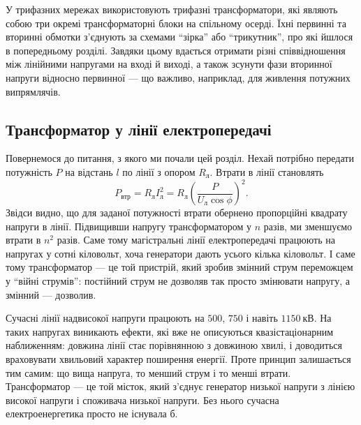 У трифазних мережах використовують трифазні трансформатори, які
являють собою три окремі трансформаторні блоки на спільному
осерді. Їхні первинні та вторинні обмотки з'єднують за схемами
\enquote{зірка} або \enquote{трикутник}, про які йшлося в попередньому розділі.
Завдяки цьому вдається отримати різні співвідношення між
лінійними напругами на вході й виході, а також зсунути фази
вторинної напруги відносно первинної --- що важливо, наприклад,
для живлення потужних випрямлячів.

\subsection*{Трансформатор у лінії електропередачі}

Повернемося до питання, з якого ми почали цей розділ. Нехай
потрібно передати потужність $P$ на відстань $l$ по лінії з
опором $R_{\text{л}}$. Втрати в лінії становлять
\begin{equation}\label{eq:line_losses_transformer}
	P_{\text{втр}} = R_{\text{л}} I_{\text{л}}^2
	                = R_{\text{л}} \left(\frac{P}{U_{\text{л}}\cos\phi}\right)^2.
\end{equation}
Звідси видно, що для заданої потужності втрати обернено
пропорційні квадрату напруги в лінії. Підвищивши напругу
трансформатором у $n$ разів, ми зменшуємо втрати в $n^2$ разів.
Саме тому магістральні лінії електропередачі працюють на
напругах у сотні кіловольт, хоча генератори дають усього
кілька кіловольт. І саме тому трансформатор --- це той пристрій,
який зробив змінний струм переможцем у \enquote{війні струмів}:
постійний струм не дозволяв так просто змінювати напругу, а
змінний --- дозволив.

\begin{Attention}
	Сучасні лінії надвисокої напруги працюють на $500$,
	$750$ і навіть $1150\ \text{кВ}$. На таких напругах
	виникають ефекти, які вже не описуються квазістаціонарним
	наближенням: довжина лінії стає порівнянною з довжиною
	хвилі, і доводиться враховувати хвильовий характер
	поширення енергії. Проте принцип залишається тим самим:
	що вища напруга, то менший струм і то менші втрати.
	Трансформатор --- це той місток, який з'єднує генератор
	низької напруги з лінією високої напруги і споживача
	низької напруги. Без нього сучасна електроенергетика
	просто не існувала б.
\end{Attention}

